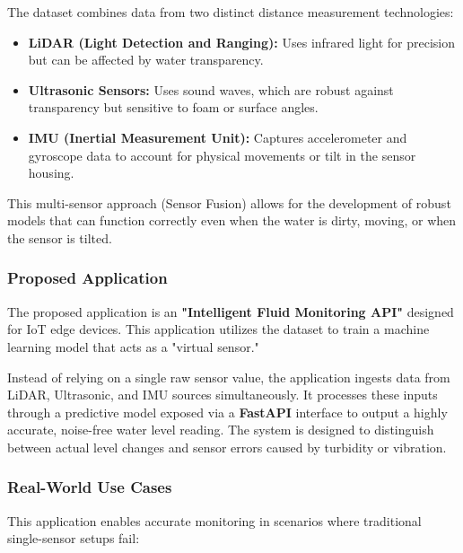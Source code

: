 \documentclass[12pt, a4paper]{article}
\begin{document}
The dataset combines data from two distinct distance measurement technologies:
\begin{itemize}
    \item \textbf{LiDAR (Light Detection and Ranging):} Uses infrared light for precision but can be affected by water transparency.
    \item \textbf{Ultrasonic Sensors:} Uses sound waves, which are robust against transparency but sensitive to foam or surface angles.
    \item \textbf{IMU (Inertial Measurement Unit):} Captures accelerometer and gyroscope data to account for physical movements or tilt in the sensor housing.
\end{itemize}
This multi-sensor approach (Sensor Fusion) allows for the development of robust models that can function correctly even when the water is dirty, moving, or when the sensor is tilted.

\newpage

\subsubsection{Proposed Application}
The proposed application is an \textbf{"Intelligent Fluid Monitoring API"} designed for IoT edge devices. This application utilizes the dataset to train a machine learning model that acts as a "virtual sensor." 

Instead of relying on a single raw sensor value, the application ingests data from LiDAR, Ultrasonic, and IMU sources simultaneously. It processes these inputs through a predictive model exposed via a \textbf{FastAPI} interface to output a highly accurate, noise-free water level reading. The system is designed to distinguish between actual level changes and sensor errors caused by turbidity or vibration.

\subsubsection{Real-World Use Cases}
This application enables accurate monitoring in scenarios where traditional single-sensor setups fail:
\end{document}
